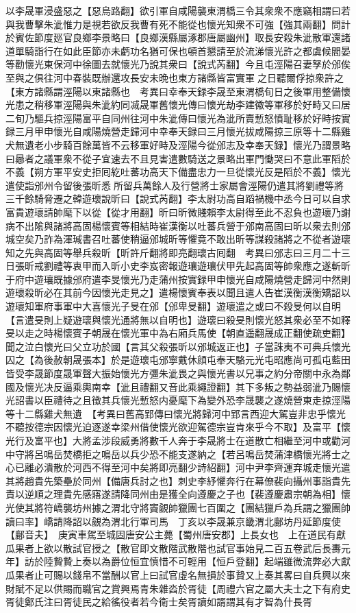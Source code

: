 以李晟軍浸盛惡之【惡烏路翻】欲引軍自咸陽襲東渭橋三令其衆衆不應竊相謂曰若與我曹擊朱泚惟力是視若欲反我曹有死不能從也懷光知衆不可強【強其兩翻】問計於賓佐節度廵官良鄉李景略曰【良鄉漢縣屬涿郡唐屬幽州】取長安殺朱泚散軍還諸道單騎詣行在如此臣節亦未虧功名猶可保也頓首懇請至於流涕懷光許之都虞候閻晏等勸懷光東保河中徐圖去就懷光乃說其衆曰【說式芮翻】今且屯涇陽召妻孥於邠俟至與之俱往河中春裝既辦還攻長安未晩也東方諸縣皆富實軍之日聽爾俘掠衆許之【東方諸縣謂涇陽以東諸縣也　考異曰幸奉天録李晟至東渭橋旬日之後軍用整備懷光患之稍移軍涇陽與朱泚約同㓕晟軍舊懷光傳曰懷光劫李建徽等軍移於好畤又曰居二旬乃驅兵掠涇陽富平自同州往河中朱泚傳曰懷光為泚所賣慙怒憤耻移於好畤按實録三月甲申懷光自咸陽燒營走歸河中幸奉天録曰三月懷光拔咸陽掠三原等十二縣雞犬無遺老小步騎百餘萬皆不云移軍好畤及涇陽今從邠志及幸奉天録】懷光乃謂景略曰曏者之議軍衆不從子宜速去不且見害遣數騎送之景略出軍門慟哭曰不意此軍䧟於不義【朔方軍平安史拒囘紇吐蕃功高天下備盡忠力一旦從懷光反是䧟於不義】懷光遣使詣邠州令留後張昕悉所留兵萬餘人及行營將士家屬會涇陽仍遣其將劉禮等將三千餘騎脅遷之韓遊瓌說昕曰【說式芮翻】李太尉功高自蹈禍機中丞今日可以自求富貴遊瓌請帥麾下以從【從才用翻】昕曰昕微賤賴李太尉得至此不忍負也遊瓌乃謝病不出隂與諸將高固楊懷賓等相結時崔漢衡以吐蕃兵營于邠南高固曰昕以衆去則邠城空矣乃詐為渾瑊書召吐蕃使稍逼邠城昕等懼竟不敢出昕等謀殺諸將之不從者遊瓌知之先與高固等舉兵殺昕【昕許斤翻將即亮翻瓌古囘翻　考異曰邠志曰三月二十三日張昕戒劉禮等衷甲而入昕小史李岌密報遊瓖遊瓖伏甲先起高固等帥衆應之遂斬昕于府中遊瓖既據邠府遣李旻懷光乃走蒲州按實録甲申懷光自咸陽燒營走歸河中然則遊瓌殺昕必在其前今因懷光走見之】遣楊懷賓奉表以聞且遣人告崔漢衡漢衡矯詔以遊瓌知軍府事軍中大喜懷光子旻在邠【邠卑旻翻】遊瓌遣之或曰不殺旻何以自明【言遣旻則上疑遊瓌與懷光通將無以自明也】遊瓌曰殺旻則懷光怒其衆必至不如釋旻以走之時楊懷賓子朝晟在懷光軍中為右廂兵馬使【朝直遥翻晟成正翻使疏吏翻】聞之泣白懷光曰父立功於國【言其父殺張昕以邠城返正也】子當誅夷不可典兵懷光囚之【為後赦朝晟張本】於是遊瓌屯邠寧戴休顔屯奉天駱元光屯昭應尚可孤屯藍田皆受李晟節度晟軍聲大振始懷光方彊朱泚畏之與懷光書以兄事之約分帝關中永為鄰國及懷光决反逼乘輿南幸【泚且禮翻又音此乘繩證翻】其下多叛之勢益弱泚乃賜懷光詔書以臣禮待之且徵其兵懷光慙怒内憂麾下為變外恐李晟襲之遂燒營東走掠涇陽等十二縣雞犬無遺　【考異曰舊高郢傳曰懷光將歸河中郢言西迎大駕豈非忠乎懷光不聽按德宗因懷光迫逐遂幸梁州借使懷光欲迎駕德宗豈肯來乎今不取】及富平【懷光行及富平也】大將孟涉段威勇將數千人奔于李晟將士在道散亡相繼至河中或勸河中守將呂鳴岳焚橋拒之鳴岳以兵少恐不能支遂納之【若呂鳴岳焚蒲津橋懷光將士之心已離必潰散於河西不得至河中矣將即亮翻少詩紹翻】河中尹李齊運弃城走懷光遣其將趙貴先築壘於同州【備唐兵討之也】刺史李紓懼奔行在幕僚裴向攝州事詣貴先責以逆順之理貴先感寤遂請降同州由是獲全向遵慶之子也【裴遵慶肅宗朝為相】懷光使其將符嶠襲坊州據之渭北守將竇覦帥獵團七百圍之【團結獵戶為兵謂之獵團帥讀曰率】嶠請降詔以覦為渭北行軍司馬　丁亥以李晟兼京畿渭北鄜坊丹延節度使【鄜音夫】　庚寅車駕至城固唐安公主薨【蜀州唐安郡】上長女也　上在道民有獻瓜果者上欲以散試官授之【散官即文散階武散階也試官事始見二百五卷武后長夀元年】訪於陸贄贄上奏以為爵位恒宜慎惜不可輕用【恒戶登翻】起端雖微流弊必大獻瓜果者止可賜以錢帛不當酬以官上曰試官虛名無損於事贄又上奏其畧曰自兵興以來財賦不足以供賜而職官之賞興焉青朱雜㳫於胥徒【周禮六官之屬大夫士之下有府史胥徒鄭氏注曰胥徒民之給徭役者若今衛士矣胥讀如諝謂其有才智為什長胥